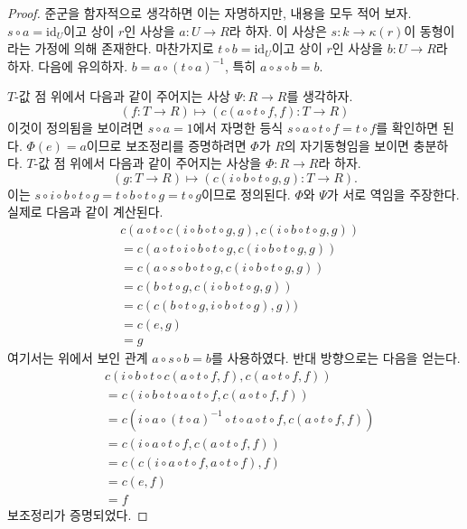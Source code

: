 \begin{proof}
준군을 함자적으로 생각하면 이는 자명하지만, 내용을 모두 적어 보자.
$s \circ a = \text{id}_U$이고 상이 $r$인 사상을 $a : U \to R$라 하자.
이 사상은 $s : k \to \kappa(r)$이 동형이라는 가정에 의해 존재한다.
마찬가지로 $t \circ b = \text{id}_U$이고 상이 $r$인 사상을
$b : U \to R$라 하자. 다음에 유의하자.
$b = a \circ (t \circ a)^{-1}$, 특히 $a \circ s \circ b = b$.

\medskip\noindent
$T$-값 점 위에서 다음과 같이 주어지는 사상 $\Psi : R \to R$를 생각하자.
$$
(f : T \to R) \longmapsto (c(a \circ t \circ f, f) : T \to R)
$$
이것이 정의됨을 보이려면 $s \circ a = 1$에서 자명한 등식
$s \circ a \circ t \circ f = t \circ f$를 확인하면 된다.
$\Phi(e) = a$이므로 보조정리를 증명하려면 $\Phi$가 $R$의 자기동형임을
보이면 충분하다. $T$-값 점 위에서 다음과 같이 주어지는 사상을
$\Phi : R \to R$라 하자.
$$
(g : T \to R) \longmapsto (c(i \circ b \circ t \circ g, g) : T \to R).
$$
이는
$s \circ i \circ b \circ t \circ g = t \circ b \circ t \circ g =
t \circ g$이므로 정의된다. $\Phi$와 $\Psi$가 서로 역임을 주장한다.
실제로 다음과 같이 계산된다.
\begin{align*}
& c(a \circ t \circ c(i \circ b \circ t \circ g, g),
c(i \circ b \circ t \circ g, g)) \\
& =
c(a \circ t \circ i \circ b \circ t \circ g,
c(i \circ b \circ t \circ g, g)) \\
& =
c(a \circ s \circ b \circ t \circ g,
c(i \circ b \circ t \circ g, g)) \\
& =
c(b \circ t \circ g, c(i \circ b \circ t \circ g, g)) \\
& =
c(c(b \circ t \circ g, i \circ b \circ t \circ g), g)) \\
& =
c(e, g) \\
& = g
\end{align*}
여기서는 위에서 보인 관계 $a \circ s \circ b = b$를 사용하였다.
반대 방향으로는 다음을 얻는다.
\begin{align*}
& c(i \circ b \circ t \circ c(a \circ t \circ f, f), c(a \circ t \circ f, f)) \\
& =
c(i \circ b \circ t \circ a \circ t \circ f, c(a \circ t \circ f, f)) \\
& =
c(i \circ a \circ (t \circ a)^{-1} \circ t \circ a \circ t \circ f,
c(a \circ t \circ f, f)) \\
& =
c(i \circ a \circ t \circ f, c(a \circ t \circ f, f)) \\
& =
c(c(i \circ a \circ t \circ f, a \circ t \circ f), f) \\
& =
c(e, f) \\
& = f
\end{align*}
보조정리가 증명되었다.
\end{proof}

